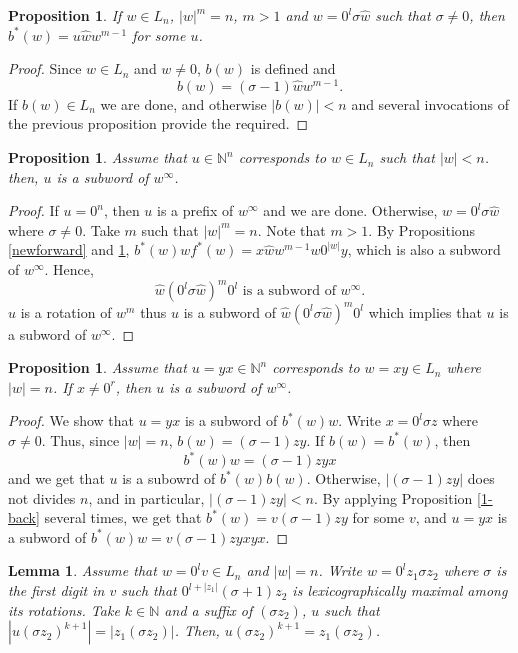 \documentclass{article}
\newtheorem{proposition}[theorem]{Proposition}
\newtheorem{lemma}[theorem]{Lemma}
\theoremstyle{definition}
\newcommand{\N}{{\mathbb{N}}}
\begin{document}
\begin{proposition}
\label{*-back}
If $w\in L_n$, $|w|^m=n$, $m>1$ and $w= 0^l\sigma\hat{w}$ such that $\sigma\neq 0$, then $b^*(w)=u\hat{w}w^{m-1}$ for some $u$.
\end{proposition}

\begin{proof}
Since $w\in L_n$ and $w\neq 0$, $b(w)$ is defined and 
$$b(w)=(\sigma-1)\hat{w}w^{m-1}.$$
If $b(w)\in L_n$ we are done, and otherwise $|b(w)|<n$ and several invocations of the previous proposition provide the required.
\end{proof}


\begin{proposition}
Assume that $u\in \mathbb{N}^n$ corresponds to $w\in L_n$ such that $|w|<n$. then, $u$ is a subword of $w^\infty$. 
\end{proposition}

\begin{proof}
If $u=0^n$, then $u$ is a prefix of $w^\infty$ and we are done. Otherwise, $w=0^l\sigma\hat{w}$ where $\sigma\neq 0$. Take $m$ such that $|w|^m=n$. Note that $m>1$. By Propositions \ref{newforward} and  \ref{*-back}, $b^*(w)wf^*(w)=x\hat{w}w^{m-1}w0^{|w|}y$, which is also a subword of $w^\infty$. Hence, 
$$\hat{w}(0^l\sigma\hat{w})^m0^l \text{ is a subword of } w^\infty.$$
$u$ is a rotation of $w^m$ thus $u$ is a subword of $\hat{w}(0^l\sigma\hat{w})^m0^l$ which implies that $u$ is a subword of $w^\infty$.
\end{proof}


\begin{proposition}
Assume that $u=yx\in\mathbb{N}^n$ corresponds to $w=xy\in L_n$ where $|w|=n$. If $x\neq 0^r$, then $u$ is a subword of $w^\infty$. 
\end{proposition}

\begin{proof}
We show that $u=yx$ is a subword of $b^*(w)w$. Write $x=0^l\sigma z$ where $\sigma\neq 0$. Thus, since $|w|=n$, $b(w)=(\sigma-1)zy$. If $b(w)=b^*(w)$, then 
$$b^*(w)w=(\sigma-1)zyx$$
and we get that $u$ is a subowrd of $b^*(w)b(w)$. Otherwise, $|(\sigma-1)zy|$ does not divides $n$, and in particular, $|(\sigma-1)zy|<n$. By applying Proposition \ref{1-back} several times, we get that $b^*(w)=v(\sigma-1)zy$ for some $v$, and $u=yx$ is a subword of $b^*(w)w=v(\sigma-1)zyxyx$.
\end{proof}

\begin{lemma}
\label{z1}
Assume that $w=0^lv\in L_n$ and $|w|=n$. Write $w=0^lz_1\sigma z_2$ where $\sigma$ is the first digit in $v$ such that $0^{l+|z_1|}(\sigma+1)z_2$ is lexicographically maximal among its rotations. Take $k\in \N$ and a suffix of $(\sigma z_2)$, $u$ such that $|u(\sigma z_2)^{k+1}|=|z_1(\sigma z_2)|$. Then, $u(\sigma z_2)^{k+1}= z_1(\sigma z_2)$.
\end{lemma}
\end{document}
